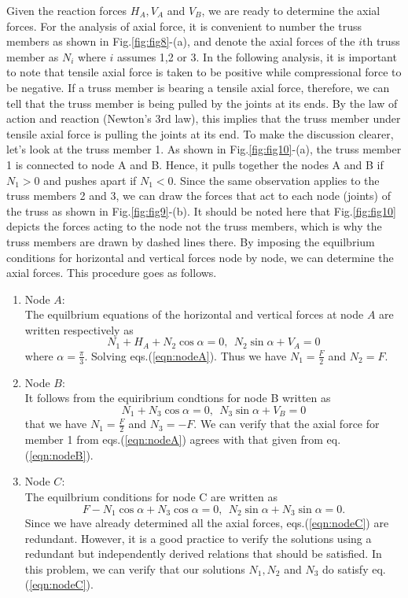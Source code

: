 \documentclass[10pt,a4j]{article}
\begin{document}
Given the reaction forces $H_A, V_A$ and $V_B$, we are ready to determine the axial forces. 
For the analysis of axial force, it is convenient to number the truss members as 
shown in Fig.\ref{fig:fig8}-(a), and denote the axial forces of the $i$th truss member 
as $N_i$ where $i$ assumes 1,2 or 3. 
In the following analysis, it is important to note that tensile axial force is taken to be 
positive while compressional force to be negative. If a truss member is bearing a tensile axial 
force, therefore, we can tell that the truss member is being pulled by the joints at its ends.
By the law of action and reaction (Newton's 3rd law), this implies that the truss member under  
tensile axial force is pulling the joints at its end. To make the discussion clearer, 
let's look at the truss member 1. As shown in Fig.\ref{fig:fig10}-(a), the truss member 1 is 
connected to node A and B. Hence, it pulls together the nodes A and B if $N_1>0$ and 
 pushes apart if $N_1<0$. 
 Since the same observation applies to the truss members 2 and 3, we can draw 
 the forces that act to each node (joints) of the truss as shown in Fig.\ref{fig:fig9}-(b).
It should be noted here that Fig.\ref{fig:fig10} depicts the forces acting to the node not 
the truss members, which is why the truss members are drawn by dashed lines there. 
By imposing the equilbrium conditions for horizontal and vertical forces node by node, 
we can determine the axial forces. This procedure goes as follows.
\begin{enumerate}
\item
	Node $A$: \\
	The equilbrium equations of the horizontal and vertical forces at node $A$
	are written respectively as 
	\begin{equation}
		N_1+H_A+N_2\cos\alpha=0, \ \ N_2\sin\alpha+V_A=0
		\label{eqn:nodeA}
	\end{equation}
	where $\alpha=\frac{\pi}{3}$. Solving eqs.(\ref{eqn:nodeA}). 
	Thus we have $N_1=\frac{F}{2}$ and $N_2=F$. 
\item
	Node $B$: \\
	It follows from the equiribrium condtions for node B written as 
	\begin{equation}
		N_1+N_3\cos\alpha=0, \ \ N_3\sin\alpha+V_B=0
		\label{eqn:nodeB}
	\end{equation}
	that we have $N_1=\frac{F}{2}$ and $N_3=-F$.
	We can verify that the axial force for member 1 from eqs.(\ref{eqn:nodeA}) 
	agrees with that given from eq.(\ref{eqn:nodeB}).
\item
	Node $C$: \\
	The equilbrium conditions for node C are written as 
	\begin{equation}
		F-N_1\cos\alpha+N_3\cos\alpha=0, \ \ N_2\sin\alpha+N_3\sin\alpha=0.
		\label{eqn:nodeC}
	\end{equation}
	Since we have already determined all the axial forces, eqs.(\ref{eqn:nodeC}) are redundant.  
	However, it is a good practice to verify the solutions using a redundant 
	but independently derived relations that should be satisfied.  
	In this problem, we can verify that our solutions $N_1,N_2$ and $N_3$ do 
	satisfy eq.(\ref{eqn:nodeC}).
\end{enumerate}
\end{document}
